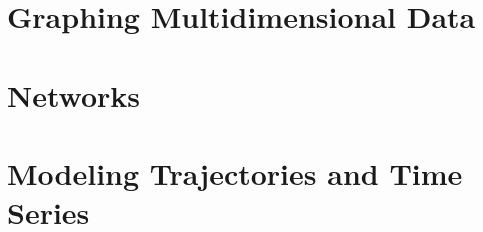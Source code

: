 \documentclass[
]{book}
\begin{document}
\hypertarget{graphing-multidimensional-data}{%
\chapter{Graphing Multidimensional Data}\label{graphing-multidimensional-data}}

\hypertarget{networks}{%
\chapter{Networks}\label{networks}}

\hypertarget{modeling-trajectories-and-time-series}{%
\chapter{Modeling Trajectories and Time Series}\label{modeling-trajectories-and-time-series}}

  
\end{document}
